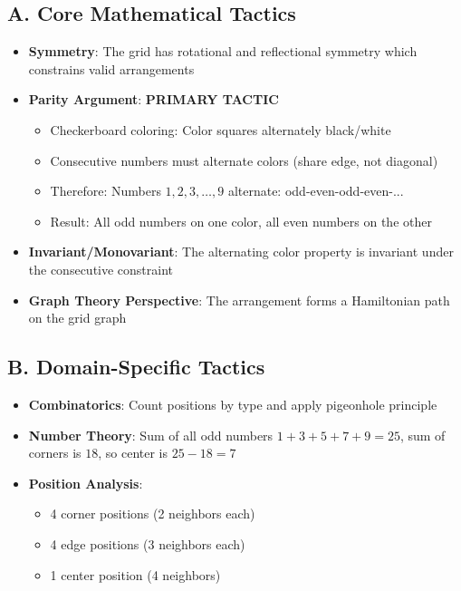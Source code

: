 \documentclass[11pt]{article}
\begin{document}
\begin{tacticalbox}
\subsection*{A. Core Mathematical Tactics}
\begin{itemize}[leftmargin=*]
    \item \textbf{Symmetry}: The grid has rotational and reflectional symmetry which constrains valid arrangements
    \item \textbf{Parity Argument}: \textbf{PRIMARY TACTIC}
    \begin{itemize}
        \item Checkerboard coloring: Color squares alternately black/white
        \item Consecutive numbers must alternate colors (share edge, not diagonal)
        \item Therefore: Numbers $1,2,3,\ldots,9$ alternate: odd-even-odd-even-...
        \item Result: All odd numbers on one color, all even numbers on the other
    \end{itemize}
    \item \textbf{Invariant/Monovariant}: The alternating color property is invariant under the consecutive constraint
    \item \textbf{Graph Theory Perspective}: The arrangement forms a Hamiltonian path on the grid graph
\end{itemize}

\subsection*{B. Domain-Specific Tactics}
\begin{itemize}[leftmargin=*]
    \item \textbf{Combinatorics}: Count positions by type and apply pigeonhole principle
    \item \textbf{Number Theory}: Sum of all odd numbers $1+3+5+7+9=25$, sum of corners is $18$, so center is $25-18=7$
    \item \textbf{Position Analysis}: 
    \begin{itemize}
        \item 4 corner positions (2 neighbors each)
        \item 4 edge positions (3 neighbors each)  
        \item 1 center position (4 neighbors)
    \end{itemize}
\end{itemize}


\end{tacticalbox}
\end{document}
